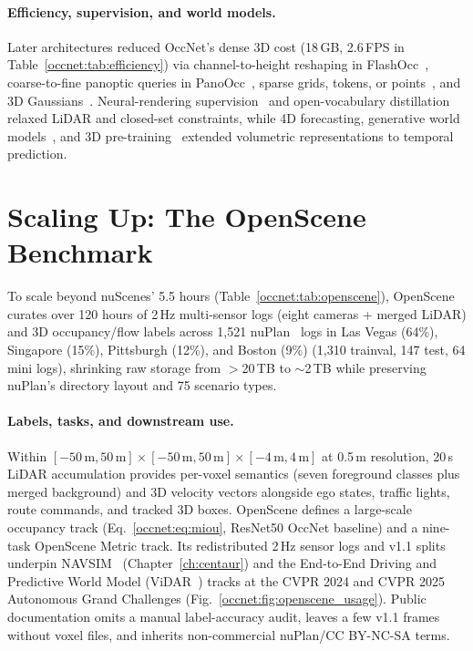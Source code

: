 \paragraph{Efficiency, supervision, and world models.} Later architectures reduced OccNet's dense 3D cost (18\,GB, 2.6\,FPS in Table~\ref{occnet:tab:efficiency}) via channel-to-height reshaping in FlashOcc~\cite{yu2023flashocc}, coarse-to-fine panoptic queries in PanoOcc~\cite{wang2024panoocc}, sparse grids, tokens, or points~\cite{tang2024sparseocc,liu2024sparseocc,wang2024opus}, and 3D Gaussians~\cite{huang2024gaussianformer,huang2025gaussianformer2}. Neural-rendering supervision~\cite{pan2024renderocc,huang2024selfocc} and open-vocabulary distillation~\cite{vobecky2023pop3d,zheng2024veon} relaxed LiDAR and closed-set constraints, while 4D forecasting, generative world models~\cite{ma2024cam4docc,zheng2024occworld,wang2026occsora,li2025uniscene}, and 3D pre-training~\cite{yang2024unipad,yan2025spot,yang2024vidar} extended volumetric representations to temporal prediction.

\section{Scaling Up: The OpenScene Benchmark}\label{occnet:sec:openscene}

To scale beyond nuScenes' 5.5 hours (Table~\ref{occnet:tab:openscene}), OpenScene~\cite{sima2023openscene} curates over 120 hours of 2\,Hz multi-sensor logs (eight cameras + merged LiDAR) and 3D occupancy/flow labels across 1,521 nuPlan~\cite{caesar2021nuplan} logs in Las Vegas (64\%), Singapore (15\%), Pittsburgh (12\%), and Boston (9\%) (1,310 trainval, 147 test, 64 mini logs), shrinking raw storage from $>$20\,TB to $\sim$2\,TB while preserving nuPlan's directory layout and 75 scenario types.

\paragraph{Labels, tasks, and downstream use.} Within $[-50\,\text{m},50\,\text{m}]\times[-50\,\text{m},50\,\text{m}]\times[-4\,\text{m},4\,\text{m}]$ at 0.5\,m resolution, 20\,s LiDAR accumulation provides per-voxel semantics (seven foreground classes plus merged background) and 3D velocity vectors alongside ego states, traffic lights, route commands, and tracked 3D boxes. OpenScene defines a large-scale occupancy track (Eq.~\eqref{occnet:eq:miou}, ResNet50 OccNet baseline) and a nine-task OpenScene Metric track. Its redistributed 2\,Hz sensor logs and v1.1 splits underpin NAVSIM~\cite{dauner2024navsim} (Chapter~\ref{ch:centaur}) and the End-to-End Driving and Predictive World Model (ViDAR~\cite{yang2024vidar}) tracks at the CVPR 2024 and CVPR 2025 Autonomous Grand Challenges (Fig.~\ref{occnet:fig:openscene_usage}). Public documentation omits a manual label-accuracy audit, leaves a few v1.1 frames without voxel files, and inherits non-commercial nuPlan/CC BY-NC-SA terms.

